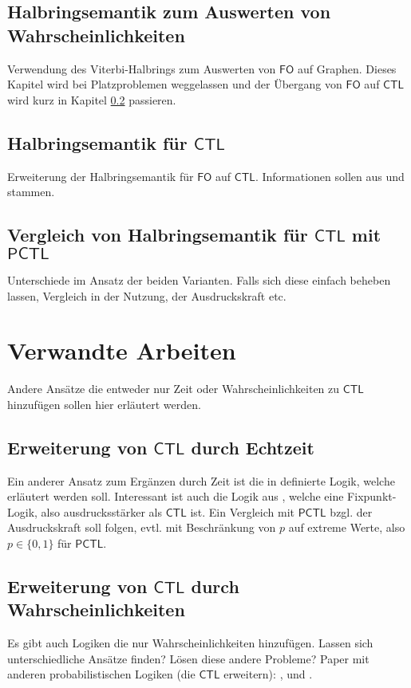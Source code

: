 \documentclass{lni}
\newcommand{\CTL}{\mathsf{CTL}}
\newcommand{\PCTL}{\mathsf{PCTL}}
\begin{document}
\subsection{Halbringsemantik zum Auswerten von Wahrscheinlichkeiten}
\label{HalbringFO}

Verwendung des Viterbi-Halbrings zum Auswerten von $\mathsf{FO}$ auf Graphen. Dieses Kapitel wird bei Platzproblemen weggelassen und der Übergang von $\mathsf{FO}$ auf $\mathsf{CTL}$ wird kurz in Kapitel \ref{HalbringCTL} passieren.

\subsection{Halbringsemantik für $\CTL$}
\label{HalbringCTL}

Erweiterung der Halbringsemantik für $\mathsf{FO}$ auf $\CTL$. Informationen sollen aus \cite{dannert2019generalized} und \cite{lluch2005quantitative} stammen.

\subsection{Vergleich von Halbringsemantik für $\CTL$ mit $\PCTL$}

Unterschiede im Ansatz der beiden Varianten. Falls sich diese einfach beheben lassen, Vergleich in der Nutzung, der Ausdruckskraft etc.

\section{Verwandte Arbeiten}
\label{ChapVerwandt}

Andere Ansätze die entweder nur Zeit oder Wahrscheinlichkeiten zu $\CTL$ hinzufügen sollen hier erläutert werden.

\subsection{Erweiterung von $\CTL$ durch Echtzeit}

Ein anderer Ansatz zum Ergänzen durch Zeit ist die in \cite{alur1990model} definierte Logik, welche erläutert werden soll. Interessant ist auch die Logik aus \cite{jahanian1986safety}, welche eine Fixpunkt-Logik, also ausdrucksstärker als $\CTL$ ist.
Ein Vergleich mit $\PCTL$ bzgl. der Ausdruckskraft soll folgen, evtl. mit Beschränkung von $p$ auf extreme Werte, also $p\in \{0,1\}$ für $\PCTL$.

\subsection{Erweiterung von $\CTL$ durch Wahrscheinlichkeiten}

Es gibt auch Logiken die nur Wahrscheinlichkeiten hinzufügen. Lassen sich unterschiedliche Ansätze finden? Lösen diese andere Probleme? Paper mit anderen probabilistischen Logiken (die $\CTL$ erweitern): \cite{hart1984probabilistic}, \cite{lehmann1982reasoning} und \cite{christoff1992reasoning}.


\end{document}
